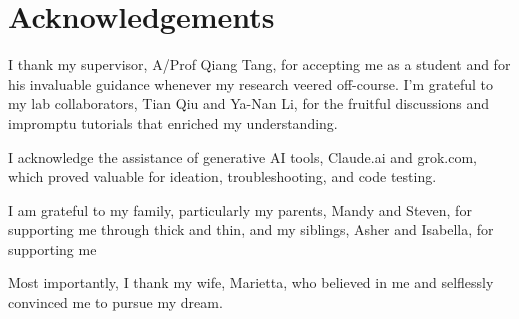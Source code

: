 \chapter*{Acknowledgements}
I thank my supervisor, A/Prof Qiang Tang, for accepting me as a student and for his invaluable guidance whenever my research veered off-course. I'm grateful to my lab collaborators, Tian Qiu and Ya-Nan Li, for the fruitful discussions and impromptu tutorials that enriched my understanding. 

I acknowledge the assistance of generative AI tools, Claude.ai and grok.com, which proved valuable for ideation, troubleshooting, and code testing.

I am grateful to my family, particularly my parents, Mandy and Steven, for supporting me through thick and thin, and my siblings, Asher and Isabella, for supporting me 

Most importantly, I thank my wife, Marietta, who believed in me and selflessly convinced me to pursue my dream.